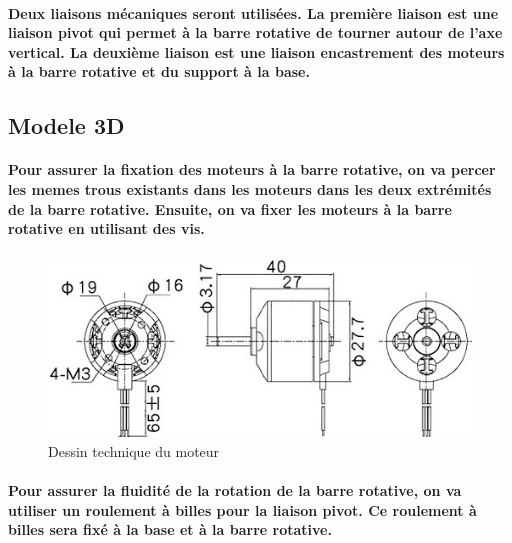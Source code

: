 \paragraph{Deux liaisons mécaniques seront utilisées. La première liaison est une liaison pivot qui permet à la barre rotative de tourner autour de l'axe vertical. La deuxième liaison est une liaison encastrement des moteurs à la barre rotative et du support à la base.}

\subsection{Modele 3D}

\paragraph{
	Pour assurer la fixation des moteurs à la barre rotative, on va percer les memes trous existants dans les moteurs dans les deux extrémités de la barre rotative. Ensuite, on va fixer les moteurs à la barre rotative en utilisant des vis.
}
\paragraph*{}
\begin{figure}[!htpb]
	\centering
	\includegraphics[width=0.6\linewidth]{Figures/motor-draw.jpg}
	\caption{Dessin technique du moteur}
	\label{fig:mobile}
\end{figure}

\paragraph{Pour assurer la fluidité de la rotation de la barre rotative, on va utiliser un roulement à billes pour la liaison pivot. Ce roulement à billes sera fixé à la base et à la barre rotative.}

